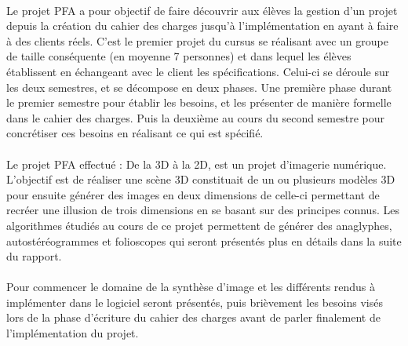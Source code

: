 \paragraph{}
        Le projet PFA a pour objectif de faire découvrir aux élèves la gestion d'un projet depuis la création du cahier des charges jusqu'à l'implémentation en ayant à faire à des clients réels. C'est le premier projet du cursus se réalisant avec un groupe de taille conséquente (en moyenne 7 personnes) et dans lequel les élèves établissent en échangeant avec le client les spécifications. Celui-ci se déroule sur les deux semestres, et se décompose en deux phases. Une première phase durant le premier semestre pour établir les besoins, et les présenter de manière formelle dans le cahier des charges. Puis la deuxième au cours du second semestre pour concrétiser ces besoins en réalisant ce qui est spécifié.

\paragraph{}      
        Le projet PFA effectué : De la 3D à la 2D, est un projet d'imagerie numérique. L'objectif est de réaliser une scène 3D constituait de un ou plusieurs modèles 3D pour ensuite générer des images en deux dimensions de celle-ci permettant de recréer une illusion de trois dimensions en se basant sur des principes connus. Les algorithmes étudiés au cours de ce projet permettent de générer des anaglyphes, autostéréogrammes et folioscopes qui seront présentés plus en détails dans la suite du rapport.
        
\paragraph{}
        Pour commencer le domaine de la synthèse d'image et les différents rendus à implémenter dans le logiciel seront présentés, puis brièvement les besoins visés lors de la phase d'écriture du cahier des charges avant de parler finalement de l'implémentation du projet.
